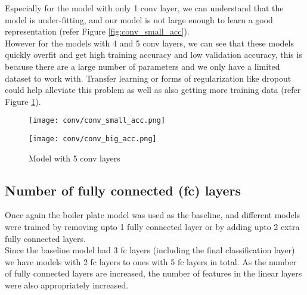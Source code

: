 \documentclass{article}
\begin{document}
\noindent
Especially for the model with only 1 conv layer, we can understand that the model is under-fitting, and our model is not large enough to learn a good representation (refer Figure \ref{fig:conv_small_acc}).
\\

\noindent
However for the models with 4 and 5 conv layers, we can see that these models quickly overfit and get high training accuracy and low validation accuracy, this is because there are a large number of parameters and we only have a limited dataset to work with. Transfer learning or forms of regularization like dropout could help alleviate this problem as well as also getting more training data (refer Figure \ref{fig:conv_big_acc}).

\begin{figure}[H]
\centering
\begin{minipage}{.5\linewidth}
  \centering
  \texttt{[image: conv/conv\_small\_acc.png]}
  \vspace{-1.0em}
  \caption{Model with 1 conv layer}
  \label{fig:conv_small_acc}
\end{minipage}%
\begin{minipage}{.5\textwidth}
  \centering
  \texttt{[image: conv/conv\_big\_acc.png]}
  \vspace{-1.0em}
  \caption{Model with 5 conv layers}
  \label{fig:conv_big_acc}
\end{minipage}
\end{figure}


\subsection{Number of fully connected (fc) layers}
Once again the boiler plate model was used as the baseline, and different models were trained by removing upto 1 fully connected layer or by adding upto 2 extra fully connected layers. \\

\noindent
Since the baseline model had 3 fc layers (including the final classification layer) we have models with 2 fc layers to ones with 5 fc layers in total.
As the number of fully connected layers are increased, the number of features in the linear layers were also appropriately increased. 
\end{document}
